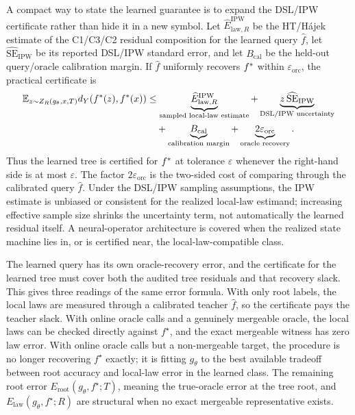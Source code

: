 A compact way to state the learned guarantee is to expand the DSL/IPW
certificate rather than hide it in a new symbol. Let
\(\widehat E_{\mathrm{law},R}^{\mathrm{IPW}}\) be the HT/H\'ajek estimate
of the C1/C3/C2 residual composition for the learned query
\(\widehat f\), let \(\widehat{\mathrm{SE}}_{\mathrm{IPW}}\) be its
reported DSL/IPW standard error, and let \(B_{\mathrm{cal}}\) be the
held-out query/oracle calibration margin. If \(\widehat f\) uniformly
recovers \(f^\ast\) within \(\varepsilon_{\mathrm{orc}}\), the practical
certificate is
\[
\begin{aligned}
  \mathbb E_{z\sim Z_R(g_\theta,x,T)}
  d_Y(f^\ast(z),f^\ast(x))
  &\le
  \underbrace{\widehat E_{\mathrm{law},R}^{\mathrm{IPW}}}
    _{\text{sampled local-law estimate}}
  +
  \underbrace{z\,\widehat{\mathrm{SE}}_{\mathrm{IPW}}}
    _{\text{DSL/IPW uncertainty}} \\
  &\quad+
  \underbrace{B_{\mathrm{cal}}}
    _{\text{calibration margin}}
  +
  \underbrace{2\varepsilon_{\mathrm{orc}}}
    _{\text{oracle recovery}} .
\end{aligned}
\]
Thus the learned tree is certified for \(f^\ast\) at tolerance
\(\varepsilon\) whenever the right-hand side is at most \(\varepsilon\).
The factor \(2\varepsilon_{\mathrm{orc}}\) is the two-sided cost of comparing
through the calibrated query \(\widehat f\). Under the DSL/IPW sampling
assumptions, the IPW estimate is unbiased or consistent for the realized
local-law estimand; increasing effective sample size shrinks the uncertainty
term, not automatically the learned residual itself. A neural-operator
architecture is covered when the realized state machine lies in, or is certified
near, the local-law-compatible class.

The learned query has its own oracle-recovery error, and the
certificate for the learned tree must cover both the audited tree
residuals and that recovery slack. This gives three readings of
the same error formula. With only root labels, the local laws are
measured through a calibrated teacher \(\widehat f\), so the
certificate pays the teacher slack. With online oracle calls and a
genuinely mergeable oracle, the local laws can be checked directly
against \(f^\star\), and the exact mergeable witness has zero law
error. With online oracle calls but a non-mergeable target, the
procedure is no longer recovering \(f^\star\) exactly; it is fitting
\(g_\theta\) to the best available tradeoff between root accuracy and
local-law error in the learned class. The remaining root error
\(E_{\mathrm{root}}(g_\theta,f^\star;T)\), meaning the true-oracle
error at the tree root, and
\(E_{\mathrm{law}}(g_\theta,f^\star;R)\) are structural when no exact
mergeable representative exists.

